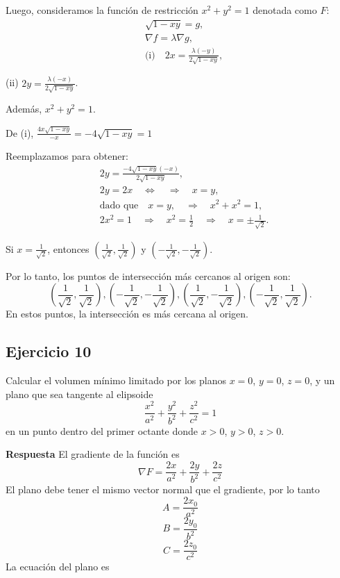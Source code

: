\documentclass{report}
\begin{document}
Luego, consideramos la función de restricción $x^{2}+y^{2}=1$ denotada como $F$:
$$
\begin{aligned}
& \sqrt{1-x y} = g, \\
& \nabla f = \lambda \nabla g, \\
& \text{(i)} \quad 2x = \frac{\lambda(-y)}{2 \sqrt{1-x y}},
\end{aligned}
$$

(ii) $2 y = \frac{\lambda(-x)}{2 \sqrt{1-x y}}$. 

Además, $x^{2}+y^{2}=1$. 

De (i), $\frac{4 x \sqrt{1-x y}}{-x} = -4 \sqrt{1-x y} = 1$ 

Reemplazamos para obtener:
$$
\begin{aligned}
& 2 y = \frac{-4 \sqrt{1-x y}(-x)}{2 \sqrt{1-x y}}, \\
& 2 y = 2 x \quad \Leftrightarrow \quad \Rightarrow \quad x = y, \\
& \text{dado que} \quad x = y, \quad \Rightarrow \quad x^{2}+x^{2}=1, \\
& 2x^{2}=1 \quad \Rightarrow \quad x^{2}=\frac{1}{2} \quad \Rightarrow \quad x= \pm \frac{1}{\sqrt{2}}.
\end{aligned}
$$

Si $x=\frac{1}{\sqrt{2}}$, entonces $\left(\frac{1}{\sqrt{2}}, \frac{1}{\sqrt{2}}\right)$ y $\left(-\frac{1}{\sqrt{2}},-\frac{1}{\sqrt{2}}\right)$.

Por lo tanto, los puntos de intersección más cercanos al origen son:
$$
\left(\frac{1}{\sqrt{2}}, \frac{1}{\sqrt{2}}\right), \left(-\frac{1}{\sqrt{2}}, -\frac{1}{\sqrt{2}}\right), \left(\frac{1}{\sqrt{2}}, -\frac{1}{\sqrt{2}}\right), \left(-\frac{1}{\sqrt{2}}, \frac{1}{\sqrt{2}}\right).
$$
En estos puntos, la intersección es más cercana al origen.\subsection{Ejercicio 10}
Calcular el volumen mínimo limitado por los planos $x=0$, $y=0$, $z=0$, y un plano que sea tangente al elipsoide
$$
\frac{x^{2}}{a^{2}}+\frac{y^{2}}{b^{2}}+\frac{z^{2}}{c^{2}}=1
$$
en un punto dentro del primer octante donde $x>0$, $y>0$, $z>0$.

\textbf{Respuesta}
El gradiente de la función es 
$$
\nabla F = \frac{2 x}{a^2} + \frac{2 y}{b^2} + \frac{2 z}{c^2}
$$
El plano debe tener el mismo vector normal que el gradiente, por lo tanto
$$
A = \frac{2 x_0}{a^2}
$$
$$B = \frac{2 y_0}{b^2} $$
$$C = \frac{2 z_0}{c^2}$$
La ecuación del plano es
\end{document}
